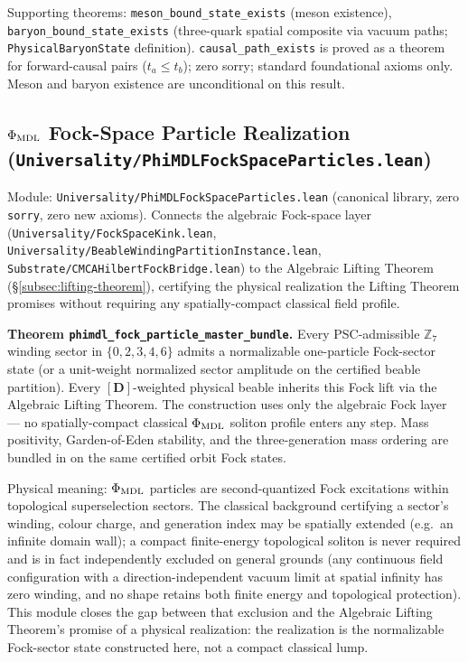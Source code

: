 \documentclass[11pt,a4paper]{article}
\newenvironment{keybox}[1]{%
  \Needspace*{8\baselineskip}%
  \begin{tcolorbox}[
    enhanced,
    breakable=false,
    colback=blue!5,
    colframe=blue!45!black,
    coltitle=black,
    colbacktitle=blue!14,
    boxrule=0.85pt,
    arc=2.5pt,
    left=9pt, right=9pt, top=6pt, bottom=6pt,
    titlerule=0.55pt,
    fonttitle=\bfseries,
    title={#1},
    before upper=\raggedright,
    before skip=0.9\baselineskip,
    after skip=0.9\baselineskip
  ]%
}{%
  \end{tcolorbox}%
}
\theoremstyle{definition}
\begin{document}
Supporting theorems: \lstinline|meson_bound_state_exists| (meson existence),
\lstinline|baryon_bound_state_exists| (three-quark spatial composite via vacuum
paths; \lstinline|PhysicalBaryonState| definition).
\lstinline|causal_path_exists| is proved as a theorem for forward-causal pairs
($t_a \leq t_b$); zero sorry; standard foundational axioms only.
Meson and baryon existence are unconditional on this result.

\subsection{\texorpdfstring{$\Phi_{\rm MDL}$}{Phi\_MDL} Fock-Space Particle Realization
  (\texttt{Universality/\allowbreak PhiMDLFockSpaceParticles.lean})}\label{subsec:phimdl-fock-space-particles}

Module: \texttt{Universality/PhiMDLFockSpaceParticles.lean} (canonical library,
zero \lstinline|sorry|, zero new axioms). Connects the algebraic Fock-space
layer (\texttt{Universality/FockSpaceKink.lean},
\texttt{Universality/BeableWindingPartitionInstance.lean},
\texttt{Substrate/CMCAHilbertFockBridge.lean}) to the Algebraic Lifting Theorem
(\S\ref{subsec:lifting-theorem}), certifying the physical realization the
Lifting Theorem promises without requiring any spatially-compact classical
field profile.

\begin{keybox}{\texorpdfstring{$\Phi_{\rm MDL}$}{Phi\_MDL} particles are Fock-space excitations}
\textbf{Theorem \lstinline|phimdl_fock_particle_master_bundle|.}
Every PSC-admissible $\mathbb{Z}_7$ winding sector in
$\{0,2,3,4,6\}$ admits a normalizable one-particle Fock-sector state (or a
unit-weight normalized sector amplitude on the certified beable partition).
Every $[\mathbf{D}]$-weighted physical beable inherits this Fock lift via the
Algebraic Lifting Theorem. The construction uses only the algebraic Fock
layer --- no spatially-compact classical $\Phi_{\rm MDL}$ soliton profile
enters any step. Mass positivity, Garden-of-Eden stability, and the
three-generation mass ordering are bundled in on the same certified
orbit Fock states.
\end{keybox}

Physical meaning: $\Phi_{\rm MDL}$ particles are second-quantized Fock
excitations within topological superselection sectors. The classical
background certifying a sector's winding, colour charge, and generation index
may be spatially extended (e.g.\ an infinite domain wall); a compact
finite-energy topological soliton is never required and is in fact
independently excluded on general grounds (any continuous field
configuration with a direction-independent vacuum limit at spatial infinity
has zero winding, and no shape retains both finite energy and topological
protection). This module closes the gap between that exclusion and the
Algebraic Lifting Theorem's promise of a physical realization: the
realization is the normalizable Fock-sector state constructed here, not a
compact classical lump.
\end{document}
